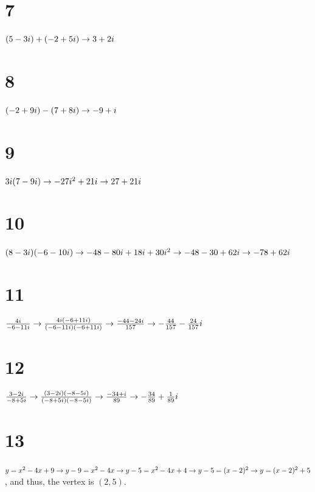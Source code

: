 \documentclass{article}
\theoremstyle{definition}
\begin{document}
\section*{7}
$(5-3i)+(-2+5i)\newline\rightarrow 3+2i$

\section*{8}
$(-2+9i)-(7+8i)\newline\rightarrow -9+i$

\section*{9}
$3i(7-9i)\newline\rightarrow -27i^2+21i\newline\rightarrow 27+21i$

\section*{10}
$(8-3i)(-6-10i)\newline\rightarrow -48-80i+18i+30i^2\newline\rightarrow -48-30+62i\newline\rightarrow -78+62i$

\section*{11}
$\frac{4i}{-6-11i}\newline\rightarrow \frac{4i(-6+11i)}{(-6-11i)(-6+11i)}\newline\rightarrow \frac{-44-24i}{157}\newline\rightarrow 
-\frac{44}{157}-\frac{24}{157}i$

\section*{12}
$\frac{3-2i}{-8+5i}\newline\rightarrow \frac{(3-2i)(-8-5i)}{(-8+5i)(-8-5i)}\newline\rightarrow \frac{-34+i}{89}\newline\rightarrow -\frac{34}{89}+\frac{1}
{89}i$

\section*{13}
$y=x^2-4x+9\newline\rightarrow y-9=x^2-4x\newline\rightarrow y-5=x^2-4x+4\newline\rightarrow y-5=(x-2)^2\newline\rightarrow y=(x-2)^2+5$, and thus, the 
vertex is $(2,5)$.
\end{document}
